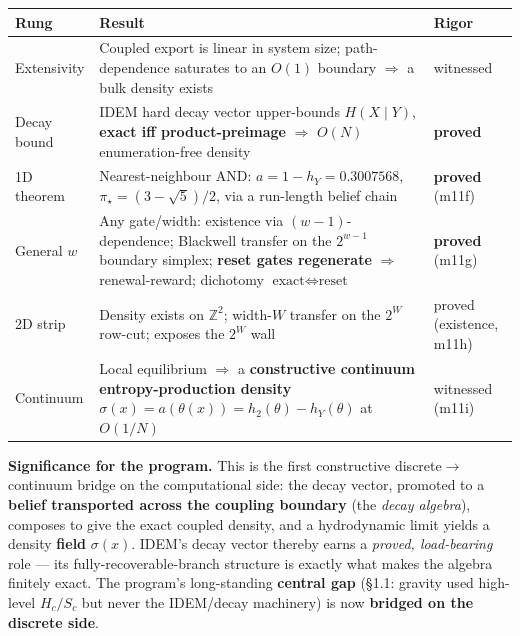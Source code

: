 \documentclass[
  11pt,
]{article}
\newcounter{none} %
\begin{document}
{\def\LTcaptype{none} %
\begin{longtable}[]{@{}
  >{\raggedright\arraybackslash}p{}
  >{\raggedright\arraybackslash}p{}
  >{\raggedright\arraybackslash}p{}@{}}
\toprule\noalign{}
\begin{minipage}[b]{\linewidth}\raggedright
Rung
\end{minipage} & \begin{minipage}[b]{\linewidth}\raggedright
Result
\end{minipage} & \begin{minipage}[b]{\linewidth}\raggedright
Rigor
\end{minipage} \\
\midrule\noalign{}
\endhead
\bottomrule\noalign{}
\endlastfoot
Extensivity & Coupled export is linear in system size; path-dependence
saturates to an \(O(1)\) boundary \(\Rightarrow\) a bulk density exists
& witnessed \\
Decay bound & IDEM hard decay vector upper-bounds \(H(X\mid Y)\),
\textbf{exact iff product-preimage} \(\Rightarrow\) \(O(N)\)
enumeration-free density & \textbf{proved} \\
1D theorem & Nearest-neighbour AND: \(a=1-h_Y=0.3007568\),
\(\pi_\star=(3-\sqrt5)/2\), via a run-length belief chain &
\textbf{proved} (m11f) \\
General \(w\) & Any gate/width: existence via \((w{-}1)\)-dependence;
Blackwell transfer on the \(2^{w-1}\) boundary simplex; \textbf{reset
gates regenerate} \(\Rightarrow\) renewal-reward; dichotomy
\(\text{exact}\Leftrightarrow\text{reset}\) & \textbf{proved} (m11g) \\
2D strip & Density exists on \(\mathbb Z^2\); width-\(W\) transfer on
the \(2^W\) row-cut; exposes the \(2^W\) wall & proved (existence,
m11h) \\
Continuum & Local equilibrium \(\Rightarrow\) a \textbf{constructive
continuum entropy-production density}
\(\sigma(x)=a(\theta(x))=h_2(\theta)-h_Y(\theta)\) at \(O(1/N)\) &
witnessed (m11i) \\
\end{longtable}
}

\textbf{Significance for the program.} This is the first constructive
discrete\(\to\)continuum bridge on the computational side: the decay
vector, promoted to a \textbf{belief transported across the coupling
boundary} (the \emph{decay algebra}), composes to give the exact coupled
density, and a hydrodynamic limit yields a density \textbf{field}
\(\sigma(x)\). IDEM's decay vector thereby earns a \emph{proved,
load-bearing} role --- its fully-recoverable-branch structure is exactly
what makes the algebra finitely exact. The program's long-standing
\textbf{central gap} (§1.1: gravity used high-level \(H_c/S_c\) but
never the IDEM/decay machinery) is now \textbf{bridged on the discrete
side}.
\end{document}
